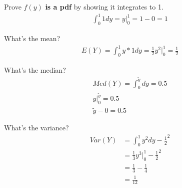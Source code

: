 \documentclass{article}
\begin{document}
Prove $f(y)$ \textbf{is a pdf} by showing it integrates to 1. 
\begin{align}
    \int_0^1 1 dy = y \bigg|_0^1 = 1 - 0 = 1
\end{align}

What's the mean? 
\begin{align}
    E(Y) = \int_0^1 y *1 dy = \frac{1}{2} y^2 \bigg|_0^1 = \frac{1}{2}
\end{align}

What's the median? 
\begin{align}
    Med(Y) = \int_0^{\tilde y} dy = 0.5 \\
    y\bigg|_0^{\tilde y} = 0.5 \\
    \tilde y - 0 = 0.5
\end{align}

What's the variance?
\begin{align}
    Var(Y) &= \int_0^1 y^2 dy - \frac{1}{2}^2\\
    &= \frac{1}{3}y^3 \bigg|_0^1  -  \frac{1}{2}^2  \\
    &= \frac{1}{3} - \frac{1}{4} \\
    &= \frac{1}{12}
\end{align}
\end{document}
